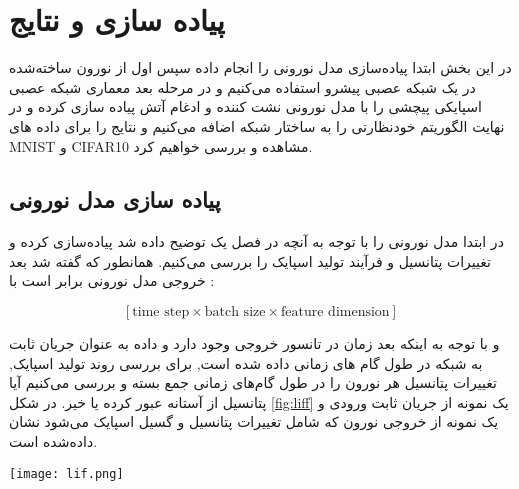 \clearpage
{}
\chapter{پیاده سازی و نتایج}

در این بخش ابتدا پیاده‌سازی مدل نورونی را انجام داده سپس اول از نورون ساخته‌شده در یک شبکه عصبی پیشرو استفاده می‌کنیم و در مرحله بعد معماری شبکه عصبی اسپایکی پیچشی را با مدل نورونی نشت کننده و ادغام آتش پیاده سازی کرده و در نهایت الگوریتم خودنظارتی را به ساختار شبکه اضافه می‌کنیم و نتایج را برای داده های MNIST و CIFAR10 مشاهده و بررسی خواهیم کرد.


\section{پیاده سازی مدل نورونی}

 در ابتدا مدل نورونی را با توجه به آنچه در فصل یک توضیح داده شد پیاده‌سازی کرده و تغییرات پتانسیل و فرآیند تولید اسپایک را بررسی می‌کنیم. همانطور که گفته شد بعد خروجی مدل نورونی برابر است با  :
 
\[
\left[ \text{time step} \times \text{batch size} \times \text{feature dimension} \right]
\]

  و با توجه به اینکه بعد زمان در تانسور خروجی وجود دارد و داده به عنوان جریان ثابت به شبکه در طول گام های زمانی داده شده است, برای بررسی روند تولید اسپایک, تغییرات پتانسیل هر نورون را در طول گام‌های زمانی جمع بسته و بررسی می‌کنیم آیا پتانسیل از آستانه عبور کرده یا خیر.
در شکل  \ref{fig:liff} یک نمونه از جریان ثابت ورودی و یک نمونه از خروجی نورون که شامل تغییرات پتانسیل و گسیل اسپایک می‌شود نشان داده‌شده است.

\begin{minipage}{\linewidth}
	\centering
	\texttt{[image: lif.png]}
	\captionsetup{font=small} %
	\label{fig:liff}
\end{minipage}







